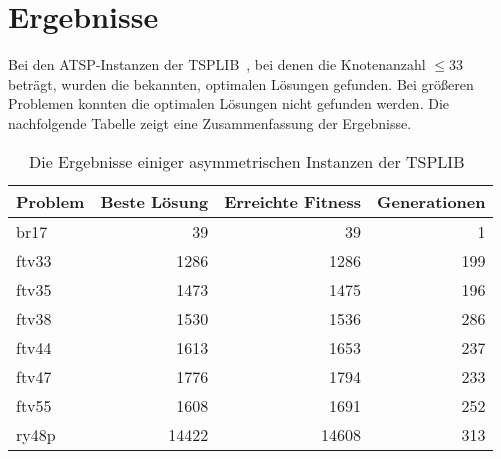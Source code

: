 \chapter{Ergebnisse}
Bei den ATSP-Instanzen der TSPLIB~\cite{tsplib}, bei denen die Knotenanzahl $\leq 33$ 
beträgt, wurden die bekannten, optimalen Lösungen gefunden. Bei größeren
Problemen konnten die optimalen Lösungen nicht gefunden werden. Die
nachfolgende Tabelle zeigt eine Zusammenfassung der Ergebnisse.
\begin{table}[H]
  \centering
{
  \setmainfont[Numbers={Uppercase,Monospaced}]{Vollkorn}
  \begin{tabular}{lrrr}
    Problem & Beste Lösung & Erreichte Fitness & Generationen \\
    \hline
    br17    & 39           & 39                & 1            \\
    ftv33   & 1286         & 1286              & 199          \\
    ftv35   & 1473         & 1475              & 196          \\
    ftv38   & 1530         & 1536              & 286          \\
    ftv44   & 1613         & 1653              & 237          \\
    ftv47   & 1776         & 1794              & 233          \\
    ftv55   & 1608         & 1691              & 252          \\
    ry48p   & 14422        & 14608             & 313          \\
  \end{tabular}
}
  \caption[Ergebnisse TSPLIB Instanzen]{Die Ergebnisse einiger asymmetrischen Instanzen der
  TSPLIB~\cite{tsplib}}
\end{table}

